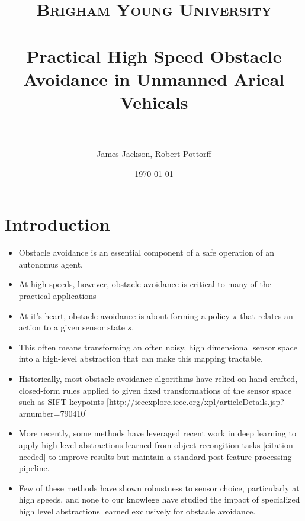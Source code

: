 \documentclass[paper=a4, fontsize=11pt]{scrartcl} %
\title{
\normalfont \normalsize
\textsc{Brigham Young University} \\ [25pt] %
\horrule{0.5pt} \\[0.4cm] %
\huge Practical High Speed Obstacle Avoidance in Unmanned Arieal Vehicals\\ %
\horrule{2pt} \\[0.5cm] %
}
\author{James Jackson, Robert Pottorff} %
\date{\normalsize\today} %
\begin{document}
\maketitle %


\section{Introduction}

\begin{itemize}
	\item Obstacle avoidance is an essential component of a safe operation of an autonomus agent.
	\item At high speeds, however, obstacle avoidance is critical to many of the practical applications
\end{itemize}
	
\begin{itemize}
	\item At it's heart, obstacle avoidance is about forming a policy $\pi$ that relates an action to a given sensor state $s$.
	\item This often means transforming an often noisy, high dimensional sensor space into a high-level abstraction that can make this mapping tractable.
\end{itemize}
	
\begin{itemize}
	\item Historically, most obstacle avoidance algorithms have relied on hand-crafted, closed-form rules applied to given fixed transformations of the sensor space such as SIFT keypoints [http://ieeexplore.ieee.org/xpl/articleDetails.jsp?arnumber=790410]
	\item More recently, some methods have leveraged recent work in deep learning to apply high-level abstractions learned from object recongition tasks [citation needed] to improve results but maintain a standard post-feature processing pipeline.
	\item Few of these methods have shown robustness to sensor choice, particularly at high speeds, and none to our knowlege have studied the impact of specialized high level abstractions learned exclusively for obstacle avoidance.
\end{itemize}
\end{document}
